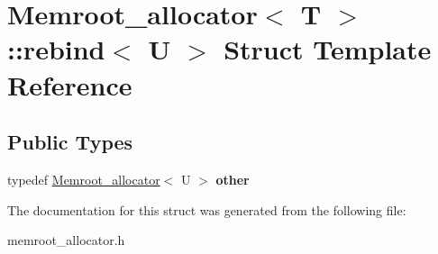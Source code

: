 \hypertarget{structMemroot__allocator_1_1rebind}{}\section{Memroot\+\_\+allocator$<$ T $>$\+:\+:rebind$<$ U $>$ Struct Template Reference}
\label{structMemroot__allocator_1_1rebind}
\subsection*{Public Types}
\begin{DoxyCompactItemize}
\item 
\mbox{\label{structMemroot__allocator_1_1rebind_a1d3b4612cd50e48a7d25f8648261482e}} 
typedef \mbox{\hyperlink{classMemroot__allocator}{Memroot\+\_\+allocator}}$<$ U $>$ {\bfseries other}
\end{DoxyCompactItemize}


The documentation for this struct was generated from the following file\+:\begin{DoxyCompactItemize}
\item 
memroot\+\_\+allocator.\+h\end{DoxyCompactItemize}
